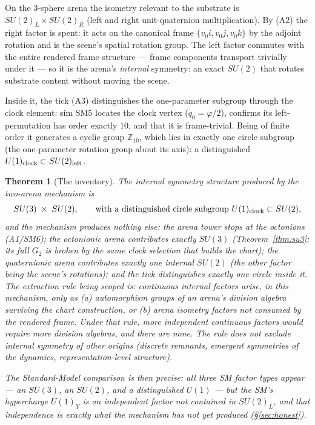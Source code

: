\documentclass[12pt]{article}
\newtheorem{theorem}{Theorem}
\theoremstyle{definition}
\theoremstyle{remark}
\begin{document}
On the 3-sphere arena the isometry relevant to the substrate is $SU(2)_L \times SU(2)_R$ (left and right unit-quaternion multiplication). By (A2) the right factor is spent: it acts on the canonical frame $\{v_0i, v_0j, v_0k\}$ by the adjoint rotation and is the scene's spatial rotation group. The left factor commutes with the entire rendered frame structure --- frame components transport trivially under it --- so it is the arena's \emph{internal} symmetry: an exact $SU(2)$ that rotates substrate content without moving the scene.

Inside it, the tick (A3) distinguishes the one-parameter subgroup through the clock element: sim SM5 locates the clock vertex ($q_0 = \varphi/2$), confirms its left-permutation has order exactly 10, and that it is frame-trivial. Being of finite order it generates a cyclic group $\mathbb Z_{10}$, which lies in exactly one circle subgroup (the one-parameter rotation group about its axis): a distinguished $U(1)_{\rm clock} \subset SU(2)_{\rm left}$.

\begin{theorem}[The inventory]\label{thm:inventory}
The internal symmetry structure produced by the two-arena mechanism is
$$SU(3) \;\times\; SU(2), \qquad \text{with a distinguished circle subgroup } U(1)_{\rm clock} \subset SU(2),$$
and the mechanism produces nothing else: the arena tower stops at the octonions (A1/SM6); the octonionic arena contributes exactly $SU(3)$ (Theorem~\ref{thm:su3}: its full $G_2$ is broken by the same clock selection that builds the chart); the quaternionic arena contributes exactly one internal $SU(2)$ (the other factor being the scene's rotations); and the tick distinguishes exactly one circle inside it. The extraction rule being scoped is: continuous internal factors arise, in this mechanism, only as (a) automorphism groups of an arena's division algebra surviving the chart construction, or (b) arena isometry factors not consumed by the rendered frame. Under that rule, more independent continuous factors would require more division algebras, and there are none. The rule does not exclude internal symmetry of other origins (discrete remnants, emergent symmetries of the dynamics, representation-level structure).

The Standard-Model comparison is then precise: all three SM factor \emph{types} appear --- an $SU(3)$, an $SU(2)$, and a distinguished $U(1)$ --- but the SM's hypercharge $U(1)_Y$ is an \emph{independent} factor not contained in $SU(2)_L$, and that independence is exactly what the mechanism has not yet produced (\S\ref{sec:honest}).
\end{theorem}
\end{document}
